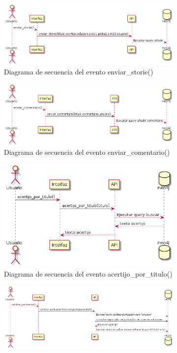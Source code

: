\begin{figure}[hbtp] \centering
\begin{subfigure}{.6\textwidth}
     \centerline{\includegraphics[width=11cm]{figuras/enviar_storie.png}}
    \caption{Diagrama de secuencia del evento enviar\_storie()} 
    \label{fig::enviarstorie}
\end{subfigure}
\begin{subfigure}{.6\textwidth}
     \centerline{\includegraphics[width=11cm]{figuras/enviar_comentario.png}}
    \caption{Diagrama de secuencia del evento enviar\_comentario()} 
    \label{fig::enviarcomentario}
\end{subfigure}
\begin{subfigure}{.6\textwidth}
     \centerline{\includegraphics[width=11cm]{figuras/acertijo_por_titulo.png}}
    \caption{Diagrama de secuencia del evento acertijo\_por\_titulo()} 
    \label{fig::acertijoportitulo}
\end{subfigure}
\begin{subfigure}{.6\textwidth}
     \centerline{\includegraphics[width=11cm]{figuras/cambiar_puntuacion.png}}

\end{subfigure}
\end{figure}
